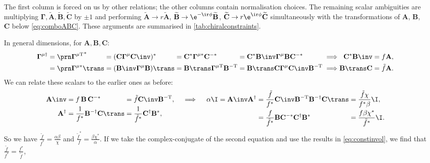 \documentclass[11pt]{article}
\newcommand{\invd}{^{-\dag}}
\newcommand{\invt}{^{-\mathrm{T}}}
\newcommand{\invc}{^{-\ast}}
\newcommand{\cc}{^\ast}
\newcommand{\hc}{^\dag}
\newcommand{\Gammab}{\boldsymbol{\Gamma}}
\newcommand{\mud}{^{\mu\dag}}
\newcommand{\mut}{^{\mu\mathrm{T}}}
\newcommand{\muc}{^{\mu\ast}}
\newcommand{\A}{\mathbf{A}}
\newcommand{\B}{\mathbf{B}}
\renewcommand{\C}{\mathbf{C}}
\newcommand{\At}{\widetilde{\A}}
\newcommand{\Bt}{\widetilde{\B}}
\newcommand{\Ct}{\widetilde{\C}}
\begin{document}
%
The first column is forced on us by other relations; the other columns contain normalisation choices.
The remaining scalar ambiguities are multiplying \(\Gammab,\At,\Bt,\Ct\) by \(\pm1\)
and performing \( \At \rightarrow r \At \), \( \Bt \rightarrow \e^{-\ir\phi} \Bt \),
\( \Ct \rightarrow r\e^{\ir\phi} \Ct \) simultaneously with the transformations of \(\A\), \(\B\), \(\C\) below \cref{eq:comboABC}.
These arguments are summarised in \cref{tab:chiralconstraints}.

In general dimensions, for \(\A,\B,\C\):
%
\begin{equation*}
\begin{alignedat}{6}
  \Gammab\mud &= \Gammap[\mut]\cc &
    &= (\C \Gammab^\mu \C\inv)\cc &
    &= \C\cc \Gammab\muc \C\invc &
    &= \C\cc \B\inv \Gammab^\mu \B \C\invc &
    &\implies &
  \C\cc \B\inv &= f \A, \\
    &= \Gammap[\muc]\trans &
    &= (\B\inv \Gammab^\mu \B)\trans &
    &= \B\trans \Gammab\mut \B\invt &
    &= \B\trans \C \Gammab^\mu \C\inv \B\invt &
    &\implies &
  \B\trans \C &= \tilde{f} \A. \\
\end{alignedat}
\end{equation*}
%
We can relate these scalars to the earlier ones as before:
%
\begin{equation*}
\begin{alignedat}[t]{2}
  \A\inv &= f \, \B \, \C\invc &
    &= \tilde{f} \C\inv \B\invt, \\
  \A\hc &= \frac{1}{f\cc} \B\invd \C\trans &
    &= \frac{1}{\tilde{f}\cc} \C\hc \B\cc,
\end{alignedat}
   \quad\implies\quad
\begin{alignedat}[t]{3}
  \alpha \I &= \A\inv \A\hc &
    &= \frac{\tilde{f}}{f\cc} \C\inv \B\invt \B\invd \C\trans &
      &= \frac{\tilde{f} \chi}{f\cc \beta} \I, \\ &&
    &= \frac{f}{\tilde{f}\cc} \B \C\invc \C\hc \B\cc &
      &= \frac{f \beta \chi\cc}{\tilde{f}\cc} \I.
\end{alignedat}
\end{equation*}
%
So we have \( \frac{\tilde{f}}{f\cc} = \frac{\alpha \beta}{\chi} \)
and \( \frac{\tilde{f}\cc}{f} = \frac{\beta \chi\cc}{\alpha} \).
If we take the complex-conjugate of the second equation and use the results in \cref{eq:constinvol},
we find that \( \frac{\tilde{f}}{f\cc} = \frac{f\cc}{\tilde{f}} \),
\end{document}
